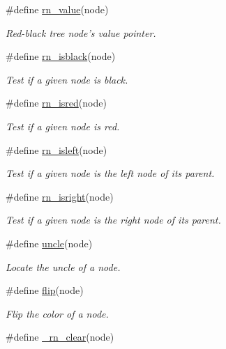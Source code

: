 \begin{CompactItemize}
\#define \hyperlink{group__dbprim__rbtree_ga38}{rn\_\-value}(node)
\begin{CompactList}\small\item\em Red-black tree node's value pointer. \item\end{CompactList}\item 
\#define \hyperlink{group__dbprim__rbtree_ga39}{rn\_\-isblack}(node)
\begin{CompactList}\small\item\em Test if a given node is black. \item\end{CompactList}\item 
\#define \hyperlink{group__dbprim__rbtree_ga40}{rn\_\-isred}(node)
\begin{CompactList}\small\item\em Test if a given node is red. \item\end{CompactList}\item 
\#define \hyperlink{group__dbprim__rbtree_ga41}{rn\_\-isleft}(node)
\begin{CompactList}\small\item\em Test if a given node is the left node of its parent. \item\end{CompactList}\item 
\#define \hyperlink{group__dbprim__rbtree_ga42}{rn\_\-isright}(node)
\begin{CompactList}\small\item\em Test if a given node is the right node of its parent. \item\end{CompactList}\item 
\#define \hyperlink{group__dbprim__rbtree_ga43}{uncle}(node)
\begin{CompactList}\small\item\em Locate the uncle of a node. \item\end{CompactList}\item 
\#define \hyperlink{group__dbprim__rbtree_ga44}{flip}(node)
\begin{CompactList}\small\item\em Flip the color of a node. \item\end{CompactList}\item 
\#define \hyperlink{group__dbprim__rbtree_ga45}{\_\-rn\_\-clear}(node)

\end{CompactItemize}
